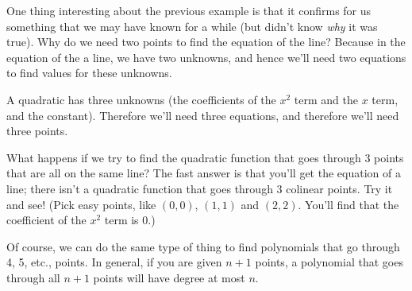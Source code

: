 One thing interesting about the previous example is that it confirms for us something that we may have known for a while (but didn't know \textit{why} it was true). Why do we need two points to find the equation of the line? Because in the equation of the a line, we have two unknowns, and hence we'll need two equations to find values for these unknowns.

\enlargethispage{\baselineskip}

A quadratic has three unknowns (the coefficients of the $x^2$ term and the $x$ term, and the constant). Therefore we'll need three equations, and therefore we'll need three points. 

What happens if we try to find the quadratic function that goes through 3 points that are all on the same line? The fast answer is that you'll get the equation of a line; there isn't a quadratic function that goes through 3 colinear points. Try it and see! (Pick easy points, like $(0,0)$, $(1,1)$ and $(2,2)$. You'll find that the coefficient of the $x^2$ term is 0.)

Of course, we can do the same type of thing to find polynomials that go through 4, 5, etc., points. In general, if you are given $n+1$ points, a polynomial that goes through all $n+1$ points will have degree at most $n$.\\


